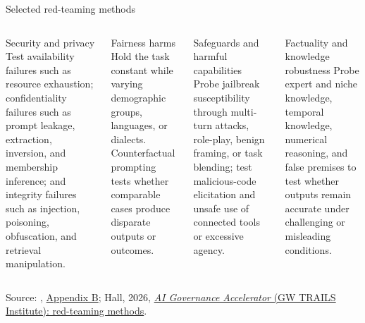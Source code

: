 \documentclass[aspectratio=169]{beamer}
\newcommand{\slidesource}[1]{\vfill\tiny\color{hrgray}Source: #1.}
\begin{document}
\begin{frame}{Selected red-teaming methods}
\small
\begin{columns}[T]
\begin{block}{Security and privacy}
Test availability failures such as resource exhaustion; confidentiality failures such as prompt leakage, extraction, inversion, and membership inference; and integrity failures such as injection, poisoning, obfuscation, and retrieval manipulation.
\end{block}
\begin{block}{Fairness harms}
Hold the task constant while varying demographic groups, languages, or dialects. Counterfactual prompting tests whether comparable cases produce disparate outputs or outcomes.
\end{block}
\begin{block}{Safeguards and harmful capabilities}
Probe jailbreak susceptibility through multi-turn attacks, role-play, benign framing, or task blending; test malicious-code elicitation and unsafe use of connected tools or excessive agency.
\end{block}
\begin{block}{Factuality and knowledge robustness}
Probe expert and niche knowledge, temporal knowledge, numerical reasoning, and false premises to test whether outputs remain accurate under challenging or misleading conditions.
\end{block}
\end{columns}
\slidesource{\parencite{Phillips2026TEVVAthlon}, \href{https://doi.org/10.6028/NIST.AI.200-2.ipd}{Appendix B}; Hall, 2026, \href{https://github.com/jphall663/GWU_LLM}{\emph{AI Governance Accelerator} (GW TRAILS Institute): red-teaming methods}}
\end{frame}
\end{document}
